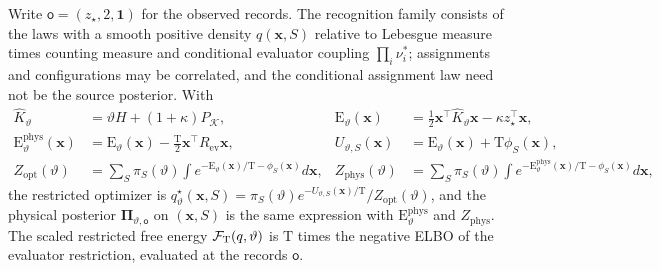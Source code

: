 Write \(\mathsf o=(z_\star,2,\mathbf 1)\) for the observed records. The
recognition family consists of the laws with a smooth positive density
\(q(\mathbf x,S)\) relative to Lebesgue measure times counting measure and
conditional evaluator coupling \(\prod_i\nu_i^*\); assignments and
configurations may be correlated, and the conditional assignment law need not
be the source posterior. With
\begin{equation}
\begin{aligned}
\widehat K_\vartheta&=\vartheta H+(1+\kappa)P_{\mathcal K},&
\mathrm E_\vartheta(\mathbf x)&=\tfrac12\mathbf x^\top\widehat K_\vartheta\mathbf x
                  -\kappa z_\star^\top\mathbf x,\\
\mathrm E_\vartheta^{\mathrm{phys}}(\mathbf x)
   &=\mathrm E_\vartheta(\mathbf x)-\tfrac{\mathrm T}2\mathbf x^\top R_{\mathrm{ev}}\mathbf x,&
U_{\vartheta,S}(\mathbf x)&=\mathrm E_\vartheta(\mathbf x)+\mathrm T\phi_S(\mathbf x),\\
Z_{\mathrm{opt}}(\vartheta)
   &=\sum_S\pi_S(\vartheta)
      \int e^{-\mathrm E_\vartheta(\mathbf x)/\mathrm T-\phi_S(\mathbf x)}d\mathbf x,&
Z_{\mathrm{phys}}(\vartheta)
   &=\sum_S\pi_S(\vartheta)
      \int e^{-\mathrm E_\vartheta^{\mathrm{phys}}(\mathbf x)/\mathrm T-\phi_S(\mathbf x)}d\mathbf x,
\end{aligned}
\label{eq:rg-formation-partition-integrals}
\end{equation}
the restricted optimizer is
\(q^\star_\vartheta(\mathbf x,S)=\pi_S(\vartheta)e^{-U_{\vartheta,S}(\mathbf x)/\mathrm T}
/Z_{\mathrm{opt}}(\vartheta)\), and the physical posterior
\(\boldsymbol\Pi_{\vartheta,\mathsf o}\) on \((\mathbf x,S)\) is the same
expression with \(\mathrm E_\vartheta^{\mathrm{phys}}\) and
\(Z_{\mathrm{phys}}\). The scaled restricted free energy
\(\mathcal F_{\mathrm T}(q,\vartheta)\) is \(\mathrm T\) times the negative ELBO
of the evaluator restriction, evaluated at the records \(\mathsf o\).

